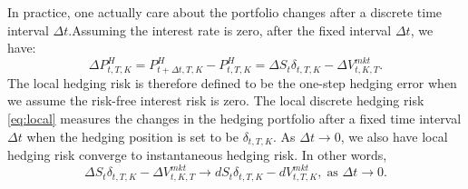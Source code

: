 \documentclass[letterpaper,12pt,titlepage,oneside,final]{book}
\numberwithin{equation}{section}
\theoremstyle{definition}
\newcommand{\DT}{\Delta t}
\newcommand{\Vmkt}{V^{mkt}}
\newcommand{\Smkt}{S}
\begin{document}
In practice, one actually care about the portfolio changes after a discrete time interval $\DT$.Assuming the interest rate is zero, after the fixed interval $\DT$,
we have:
\begin{equation}
	\label{eq:localPL}
    \Delta P^{H}_{t,T,K}=P^{H}_{t+\DT,T,K}-P^{H}_{t,T,K}=\Delta \Smkt_{t}\delta_{t,T,K} -\Delta V^{mkt}_{t,K,T}.
\end{equation}
The local hedging risk is therefore defined to be the one-step hedging error when we assume the risk-free interest risk is zero. The local discrete hedging risk \eqref{eq:local} measures  the changes in the hedging portfolio after a fixed time interval $\DT$ when the hedging position is set to be $\delta_{t,T,K}$.  
 As $\DT \rightarrow 0$, we also have local hedging risk converge to instantaneous hedging risk. In other words,
\[
\Delta \Smkt_{t}\delta_{t,T,K} -\Delta V^{mkt}_{t,K,T} \rightarrow d\Smkt_{t}\delta_{t,T,K}-d \Vmkt_{t,T,K},\; \text{as }  \DT \rightarrow 0.
\]
\end{document}
